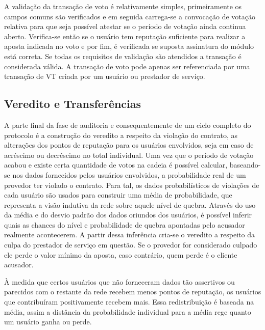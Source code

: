 %
A validação da transação de voto é relativamente simples, primeiramente os campos comuns são verificados e em seguida carrega-se a convocação de votação relativa para que seja possível atestar se o período de votação ainda continua aberto. Verifica-se então se o usuário tem reputação suficiente para realizar a aposta indicada no voto e por fim, é verificada se suposta assinatura do módulo está correta. Se todas os requisitos de validação são atendidos a transação é considerada válida. A transação de voto pode apenas ser referenciada por uma transação de \ac{VT} criada por um usuário ou prestador de serviço.


\subsection{Veredito e Transferências}
\label{sec:proposta:auditoria:vt}

A parte final da fase de auditoria e consequentemente de um ciclo completo do protocolo é a construção do veredito a respeito da violação do contrato, as alterações dos pontos de reputação para os usuários envolvidos, seja em caso de acréscimo ou decréscimo no total individual. Uma vez que o período de votação acabou e existe certa quantidade de votos na cadeia é possível calcular, baseando-se nos dados fornecidos pelos usuários envolvidos, a probabilidade real de um provedor ter violado o contrato. Para tal, os dados probabilísticos de violações de cada usuário são usados para construir uma média de probabilidade, que representa a visão indutiva da rede sobre aquele nível de quebra. Através do uso da média e do desvio padrão dos dados oriundos dos usuários, é possível inferir quais as chances do nível e probabilidade de quebra apontadas pelo acusador realmente acontecerem. A partir dessa inferência cria-se o veredito a respeito da culpa do prestador de serviço em questão. Se o provedor for considerado culpado ele perde o valor mínimo da aposta, caso contrário, quem perde é o cliente acusador. 

%
À medida que certos usuários que não forneceram dados tão assertivos ou parecidos com o restante da rede recebem menos pontos de reputação, os usuários que contribuíram positivamente recebem mais. Essa redistribuição é baseada na média, assim a distância da probabilidade individual para a média rege quanto um usuário ganha ou perde.
%

